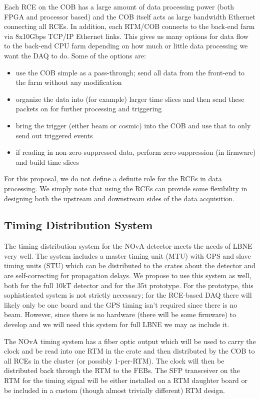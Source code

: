 Each RCE on the COB has a large amount of data processing power (both FPGA and processor based) and the COB itself acts as large bandwidth Ethernet connecting all RCEs.  In addition, each RTM/COB connects to the back-end farm via 8x10Gbps TCP/IP Ethernet links.  This gives us many options for data flow to the back-end CPU farm depending on how much or little data processing we want the DAQ to do.  Some of the options are:
\begin{itemize}
\item use the COB simple as a pass-through; send all data from the front-end to the farm without any modification
\item organize the data into (for example) larger time slices and then send these packets on for further processing and triggering
\item bring the trigger (either beam or cosmic) into the COB and use that to only send out triggered events
\item if reading in non-zero suppressed data, perform zero-suppression (in firmware) and build time slices
\end{itemize}
For this proposal, we do not define a definite role for the RCEs in data processing.  We simply note that using the RCEs can provide some flexibility in designing both the upstream and downstream sides of the data acquisition.  


\subsection{Timing Distribution System}

The timing distribution system for the NOvA detector\cite{Ayres:2007tu} meets the needs of LBNE very well.  The system includes a master timing unit (MTU) with GPS and slave timing units (STU) which can be distributed to the crates about the detector and are self-correcting for propagation delays.  We propose  to use this system as well, both for the full 10kT detector and for the 35t prototype.  For the prototype, this sophisticated system is not strictly necessary; for the RCE-based DAQ there will likely only be one board and the GPS timing isn't required since there is no beam.  However, since there is no hardware (there will be some firmware) to develop and we will need this system for full LBNE we may as include it. 

The NOvA timing system has a fiber optic output which will be used to carry the clock and  be read into one RTM in the crate and then distributed by the COB to all RCEs in the cluster (or possibly 1-per-RTM).  The clock will then be distributed  back through the RTM to the FEBs.   The SFP transceiver on the RTM for the timing signal will be either installed on a RTM daughter board or be included in a custom (though almost trivially different) RTM design.  

